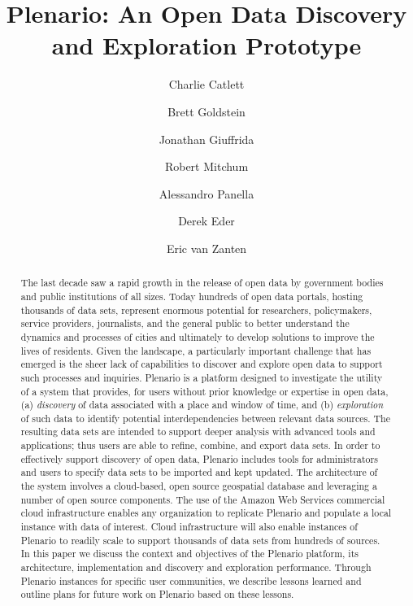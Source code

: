 \documentclass[11pt]{article}
\title{Plenario: An Open Data Discovery and Exploration Prototype}
\author[1,2]{Charlie Catlett}
\author[2,1]{Brett Goldstein}
\author[2]{Jonathan Giuffrida}
\author[1]{Robert Mitchum}
\author[1]{Alessandro Panella}
\author[3]{Derek Eder}
\author[3]{Eric van Zanten}
\affil[1]{Urban Center for Computation and Data, Computation Institute of the University of Chicago and Argonne National Laboratory}
\affil[2]{Harris School of Public Policy, University of Chicago}
\affil[3]{DataMade, LLC}
\begin{document}
\maketitle

\begin{abstract}
The last decade saw a rapid growth in the release of open data by government bodies and public institutions of all sizes. Today hundreds of open data portals, hosting thousands of data sets, represent enormous potential for researchers, policymakers, service providers, journalists, and the general public to better understand the dynamics and processes of cities and ultimately to develop solutions to improve the lives of residents. Given the landscape, a particularly important challenge that has emerged is the sheer lack of capabilities to discover and explore open data to support such processes and inquiries. Plenario is a platform designed to investigate the utility of a system that provides, for users without prior knowledge or expertise in open data, (a) \emph{discovery} of data associated with a place and window of time, and (b) \emph{exploration} of such data to identify potential interdependencies between relevant data sources. The resulting data sets are intended to support deeper analysis with advanced tools and applications; thus users are able to refine, combine, and export data sets. In order to effectively support discovery of open data, Plenario includes tools for administrators and users to specify data sets to be imported and kept updated. The architecture of the system involves a cloud-based, open source geospatial database and leveraging a number of open source components. The use of the Amazon Web Services commercial cloud infrastructure enables any organization to replicate Plenario and populate a local instance with data of interest. Cloud infrastructure will also enable instances of Plenario to readily scale to support thousands of data sets from hundreds of sources. In this paper we discuss the context and objectives of the Plenario platform, its architecture, implementation and discovery and exploration performance. Through Plenario instances for specific user communities, we describe lessons learned and outline plans for future work on Plenario based on these lessons.
\end{abstract}

\newpage
\end{document}
